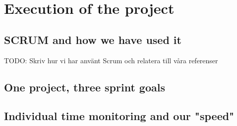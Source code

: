 


\section{Execution of the project}
\subsection{SCRUM and how we have used it}
TODO: Skriv hur vi har använt Scrum och relatera till våra referenser \cite{kniberg07}
\subsection{One project, three sprint goals}
\subsection{Individual time monitoring and our "speed"}
